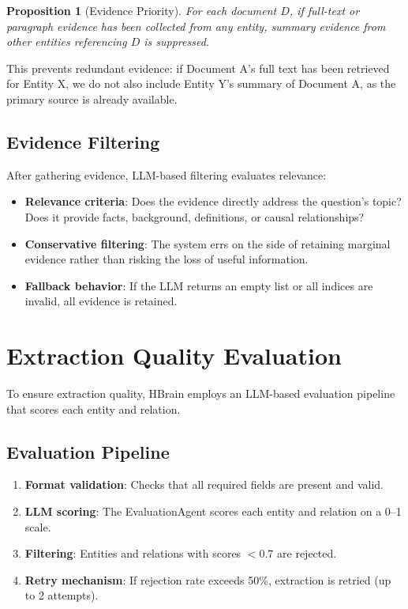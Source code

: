 \documentclass[11pt]{article}
\newtheorem{proposition}{Proposition}
\begin{document}
\begin{proposition}[Evidence Priority]
For each document $D$, if full-text or paragraph evidence has been collected from any entity, summary evidence from other entities referencing $D$ is suppressed.
\end{proposition}

This prevents redundant evidence: if Document A's full text has been retrieved for Entity X, we do not also include Entity Y's summary of Document A, as the primary source is already available.

\subsection{Evidence Filtering}

After gathering evidence, LLM-based filtering evaluates relevance:

\begin{itemize}
    \item \textbf{Relevance criteria}: Does the evidence directly address the question's topic? Does it provide facts, background, definitions, or causal relationships?
    \item \textbf{Conservative filtering}: The system errs on the side of retaining marginal evidence rather than risking the loss of useful information.
    \item \textbf{Fallback behavior}: If the LLM returns an empty list or all indices are invalid, all evidence is retained.
\end{itemize}

\section{Extraction Quality Evaluation}
\label{sec:evaluation}

To ensure extraction quality, HBrain employs an LLM-based evaluation pipeline that scores each entity and relation.

\subsection{Evaluation Pipeline}

\begin{enumerate}
    \item \textbf{Format validation}: Checks that all required fields are present and valid.
    \item \textbf{LLM scoring}: The EvaluationAgent scores each entity and relation on a 0--1 scale.
    \item \textbf{Filtering}: Entities and relations with scores $< 0.7$ are rejected.
    \item \textbf{Retry mechanism}: If rejection rate exceeds 50\%, extraction is retried (up to 2 attempts).
\end{enumerate}
\end{document}
